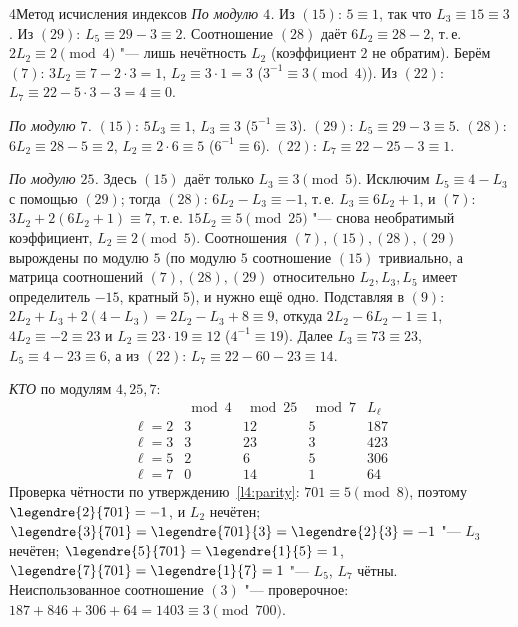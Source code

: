 \begin{lecture}{4}{Метод исчисления индексов}
\emph{По модулю $4$.} Из $(15)$: $5 \equiv 1$, так что $L_3 \equiv 15 \equiv 3$. Из $(29)$:
$L_5 \equiv 29 - 3 \equiv 2$. Соотношение $(28)$ даёт $6L_2 \equiv 28 - 2$, т.\,е. $2L_2 \equiv 2
\pmod 4$ "--- лишь нечётность $L_2$ (коэффициент $2$ не обратим). Берём $(7)$: $3L_2 \equiv 7 -
2 \cdot 3 = 1$, $L_2 \equiv 3 \cdot 1 = 3$ ($3^{-1} \equiv 3 \pmod 4$). Из $(22)$:
$L_7 \equiv 22 - 5 \cdot 3 - 3 = 4 \equiv 0$.

\emph{По модулю $7$.} $(15)$: $5L_3 \equiv 1$, $L_3 \equiv 3$ ($5^{-1} \equiv 3$). $(29)$:
$L_5 \equiv 29 - 3 \equiv 5$. $(28)$: $6L_2 \equiv 28 - 5 \equiv 2$, $L_2 \equiv 2 \cdot 6 \equiv 5$
($6^{-1} \equiv 6$). $(22)$: $L_7 \equiv 22 - 25 - 3 \equiv 1$.

\emph{По модулю $25$.} Здесь $(15)$ даёт только $L_3 \equiv 3 \pmod 5$. Исключим $L_5 \equiv 4 -
L_3$ с помощью $(29)$; тогда $(28)$: $6L_2 - L_3 \equiv -1$, т.\,е. $L_3 \equiv 6L_2 + 1$, и $(7)$:
$3L_2 + 2(6L_2 + 1) \equiv 7$, т.\,е. $15 L_2 \equiv 5 \pmod{25}$ "--- снова необратимый
коэффициент, $L_2 \equiv 2 \pmod 5$. Соотношения $(7), (15), (28), (29)$ вырождены по модулю $5$
(по модулю $5$ соотношение $(15)$ тривиально, а матрица соотношений $(7), (28), (29)$
относительно $L_2, L_3, L_5$ имеет определитель $-15$, кратный $5$), и нужно ещё одно. Подставляя в $(9)$:
$2L_2 + L_3 + 2(4 - L_3) = 2L_2 - L_3 + 8 \equiv 9$, откуда $2L_2 - 6L_2 - 1 \equiv 1$,
$4L_2 \equiv -2 \equiv 23$ и $L_2 \equiv 23 \cdot 19 \equiv 12$ ($4^{-1} \equiv 19$). Далее
$L_3 \equiv 73 \equiv 23$, $L_5 \equiv 4 - 23 \equiv 6$, а из $(22)$: $L_7 \equiv 22 - 60 - 23 \equiv 14$.

\emph{КТО} по модулям $4, 25, 7$:
\[
\begin{array}{c|ccc|r}
  & \bmod 4 & \bmod 25 & \bmod 7 & L_\ell \\ \hline
  \ell = 2 & 3 & 12 & 5 & 187\\
  \ell = 3 & 3 & 23 & 3 & 423\\
  \ell = 5 & 2 & 6 & 5 & 306\\
  \ell = 7 & 0 & 14 & 1 & 64
\end{array}
\]
Проверка чётности по утверждению~\ref{l4:parity}: $701 \equiv 5 \pmod 8$, поэтому
$\legendre{2}{701} = -1$, и $L_2$ нечётен; $\legendre{3}{701} = \legendre{701}{3} = \legendre{2}{3}
= -1$ "--- $L_3$ нечётен; $\legendre{5}{701} = \legendre{1}{5} = 1$, $\legendre{7}{701} =
\legendre{1}{7} = 1$ "--- $L_5$, $L_7$ чётны. Неиспользованное соотношение $(3)$ "--- проверочное:
$187 + 846 + 306 + 64 = 1403 \equiv 3 \pmod{700}$.


\end{lecture}
